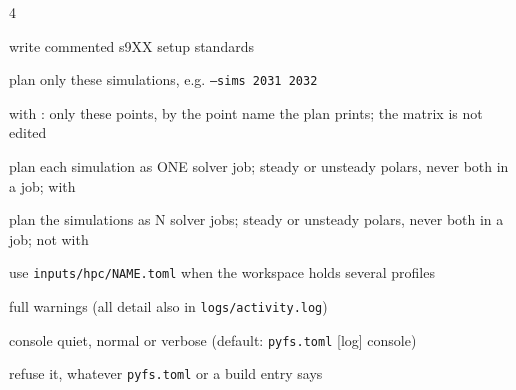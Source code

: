 \begin{multicols}{4}
\begin{flags}
\item {} write commented s9XX setup standards
\item {} plan only these simulations, e.g. \texttt{--sims 2031 2032}
\item {} with : only these points, by the point name the plan prints; the matrix is not edited
\item {} plan each simulation as ONE solver job; steady or unsteady polars, never both in a job; with 
\item {} plan the simulations as N solver jobs; steady or unsteady polars, never both in a job; not with 
\item {} use \texttt{inputs/hpc/NAME.toml} when the workspace holds several profiles
\item {} full warnings (all detail also in \texttt{logs/activity.log})
\item {} console quiet, normal or verbose (default: \texttt{pyfs.toml} [log] console)
\item {} refuse it, whatever \texttt{pyfs.toml} or a build entry says
\end{flags}


\end{multicols}
